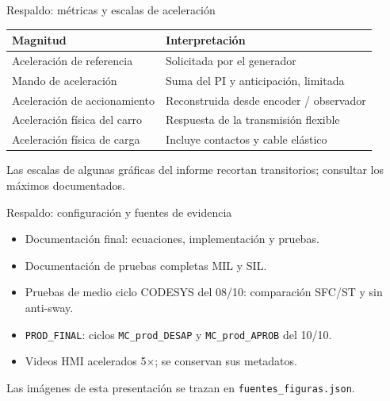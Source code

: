 \documentclass[aspectratio=169,11pt]{beamer}
\begin{document}
\begin{frame}[t,label=slide104]{Respaldo: métricas y escalas de aceleración}
\begin{center}
{\small\renewcommand{\arraystretch}{1.0}
\begin{tabular}{p{5.1cm}p{8.4cm}}\toprule
Magnitud & Interpretación\\\midrule
Aceleración de referencia & Solicitada por el generador\\
Mando de aceleración & Suma del PI y anticipación, limitada\\
Aceleración de accionamiento & Reconstruida desde encoder / observador\\
Aceleración física del carro & Respuesta de la transmisión flexible\\
Aceleración física de carga & Incluye contactos y cable elástico\\
\bottomrule\end{tabular}}\end{center}
Las escalas de algunas gráficas del informe recortan transitorios; consultar los máximos documentados.
\end{frame}
\begin{frame}[t,label=slide105]{Respaldo: configuración y fuentes de evidencia}
\begin{itemize}
\item Documentación final: ecuaciones, implementación y pruebas.
\item Documentación de pruebas completas MIL y SIL.
\item Pruebas de medio ciclo CODESYS del 08/10: comparación SFC/ST y sin anti-sway.
\item \texttt{PROD\_FINAL}: ciclos \texttt{MC\_prod\_DESAP} y \texttt{MC\_prod\_APROB} del 10/10.
\item Videos HMI acelerados 5×; se conservan sus metadatos.
\end{itemize}\vspace{4mm}\footnotesize Las imágenes de esta presentación se trazan en \texttt{fuentes\_figuras.json}.
\end{frame}
\end{document}
